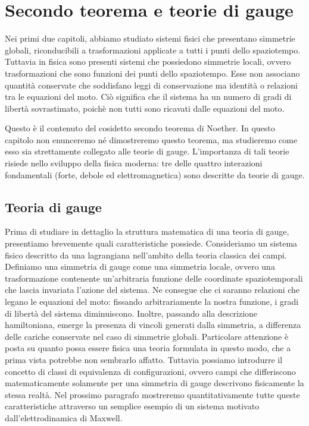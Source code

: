 \chapter{Secondo teorema e teorie di gauge}

    Nei primi due capitoli, abbiamo studiato sistemi fisici che presentano simmetrie globali, riconducibili a trasformazioni applicate a tutti i punti dello spaziotempo. Tuttavia in fisica sono presenti sistemi che possiedono simmetrie locali, ovvero trasformazioni che sono funzioni dei punti dello spaziotempo. Esse non associano quantità conservate che soddisfano leggi di conservazione ma identità o relazioni tra le equazioni del moto. Ciò significa che il sistema ha un numero di gradi di libertà sovrastimato, poichè non tutti sono ricavati dalle equazioni del moto.

    Questo è il contenuto del cosidetto secondo teorema di Noether. In questo capitolo non enunceremo né dimostreremo questo teorema, ma studieremo come esso sia strettamente collegato alle teorie di gauge. L'importanza di tali teorie risiede nello sviluppo della fisica moderna: tre delle quattro interazioni fondamentali (forte, debole ed elettromagnetica) sono descritte da teorie di gauge.

\section{Teoria di gauge}
    Prima di studiare in dettaglio la struttura matematica di una teoria di gauge, presentiamo brevemente quali caratteristiche possiede. Consideriamo un sistema fisico descritto da una lagrangiana nell'ambito della teoria classica dei campi. Definiamo una simmetria di gauge come una simmetria locale, ovvero una trasformazione contenente un'arbitraria funzione delle coordinate spaziotemporali che lascia invariata l'azione del sistema. Ne consegue che ci saranno relazioni che legano le equazioni del moto: fissando arbitrariamente la nostra funzione, i gradi di libertà del sistema diminuiscono. Inoltre, passando alla descrizione hamiltoniana, emerge la presenza di vincoli generati dalla simmetria, a differenza delle cariche conservate nel caso di simmetrie globali. Particolare attenzione è posta su quanto possa essere fisica una teoria formulata in questo modo, che a prima vista potrebbe non sembrarlo affatto. Tuttavia possiamo introdurre il concetto di classi di equivalenza di configurazioni, ovvero campi che differiscono matematicamente solamente per una simmetria di gauge descrivono fisicamente la stessa realtà. Nel prossimo paragrafo mostreremo quantitativamente tutte queste caratteristiche attraverso un semplice esempio di un sistema motivato dall'elettrodinamica di Maxwell.
    
